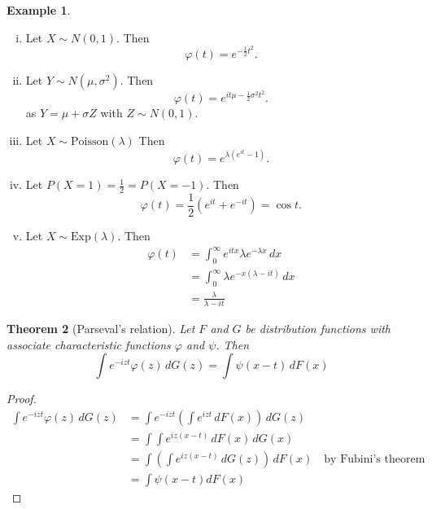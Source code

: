 \documentclass[10pt, oneside, reqno]{amsart}
\theoremstyle{plain}%
\newtheorem{thm}{Theorem}[section]
\theoremstyle{definition}
\newtheorem{exmp}[thm]{Example}
\theoremstyle{remark}
\renewcommand{\phi}{\varphi}
\begin{document}
\begin{exmp}
    \begin{enumerate}[(i)]
        \item Let $X \sim N(0,1)$.  Then \[\phi(t) = e^{-\frac{1}{2}t^2}.
        \]  
        \item Let $Y \sim N(\mu, \sigma^2)$.  Then \[
            \phi(t) = e^{it\mu - \frac{1}{2} \sigma^2 t^2}.
        \] as $Y = \mu + \sigma Z$ with $Z \sim N(0,1)$.
        \item Let $X \sim \text{Poisson}(\lambda)$  Then \[
            \phi(t) = e^{\lambda(e^{it} - 1)}.
        \]
        \item Let $P(X= 1) = \frac{1}{2} = P(X = -1)$.  Then \[
            \phi(t) = \frac{1}{2}\left(e^{it} + e^{-it} \right) = \cos t. 
        \]
        \item Let $X \sim \text{Exp}(\lambda)$.  Then \begin{align*}
            \phi(t) &= \int_0^\infty e^{itx} \lambda e^{-\lambda x} \, dx \\
                    &= \int_0^\infty \lambda e^{-x(\lambda - it)} \, dx \\
                    &= \frac{\lambda}{\lambda - it} 
        \end{align*}
    \end{enumerate}
\end{exmp}

\begin{thm}[Parseval's relation]
    Let $F$ and $G$ be distribution functions with associate characteristic functions $\phi$ and $\psi$.  Then \[
        \int e^{-izt} \phi(z) \, dG(z) = \int \psi(x - t) \, dF(x)
    \]
\end{thm}
\begin{proof}
    \begin{align*}
    \int e^{-izt} \phi(z) \, dG(z)
            &= \int e^{-izt} \left(\int e^{izt} \, dF(x) \right) \, dG(z) \\
            &= \int \int e^{iz(x-t)} \, dF(x) \, dG(x) \\
            &= \int \left( \int e^{iz(x-t)} \, dG(z) \right) \, dF(x) \quad \text{by Fubini's theorem}\\
            &= \int \psi(x-t) dF(x)
    \end{align*}
\end{proof}
\end{document}
